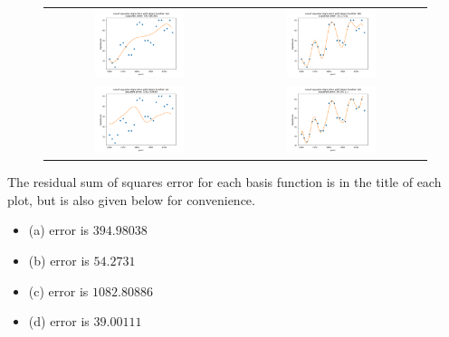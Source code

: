 \documentclass[submit]{harvardml}
\begin{document}
\begin{figure}[h]
\begin{tabular}{cc}
    \includegraphics[width=0.5\textwidth]{4-1-a.png} & \includegraphics[width=0.5\textwidth]{4-1-b.png} \\
    \includegraphics[width=0.5\textwidth]{4-1-c.png} & \includegraphics[width=0.5\textwidth]{4-1-d.png} \\
\end{tabular}
\end{figure}

The residual sum of squares error for each basis function is in the title of each plot, but is also given below for convenience.
\begin{itemize}
    \item (a) error is $394.98038$
    \item (b) error is $54.2731$
    \item (c) error is $1082.80886$
    \item (d) error is $39.00111$
\end{itemize}
\end{document}
